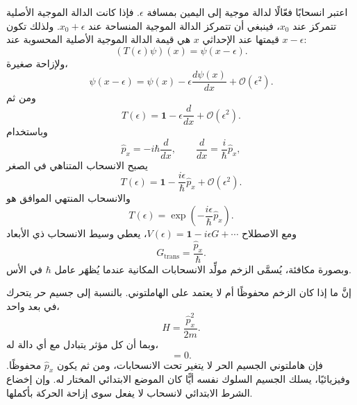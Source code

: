 اعتبر انسحابًا فعّالًا لدالة موجية إلى اليمين بمسافة \(\epsilon\). فإذا كانت الدالة الموجية الأصلية تتمركز عند \(x_0\)، فينبغي أن تتمركز الدالة الموجية المنساحة عند \(x_0+\epsilon\). ولذلك تكون قيمتها عند الإحداثي \(x\) هي قيمة الدالة الموجية الأصلية المحسوبة عند \(x-\epsilon\):
\begin{equation}
(T(\epsilon)\psi)(x)=\psi(x-\epsilon).
\end{equation}
ولإزاحة صغيرة،
\begin{equation}
\psi(x-\epsilon)
=
\psi(x)-\epsilon\frac{d\psi(x)}{dx}
+\mathcal O(\epsilon^2).
\end{equation}
ومن ثم
\begin{equation}
T(\epsilon)
=
\mathbf 1-\epsilon\frac{d}{dx}
+\mathcal O(\epsilon^2).
\end{equation}
وباستخدام
\begin{equation}
\hat p_x=-i\hbar\frac{d}{dx},
\qquad
\frac{d}{dx}=\frac{i}{\hbar}\hat p_x,
\end{equation}
يصبح الانسحاب المتناهي في الصغر
\begin{equation}
T(\epsilon)
=
\mathbf 1-\frac{i\epsilon}{\hbar}\hat p_x
+\mathcal O(\epsilon^2).
\end{equation}
والانسحاب المنتهي الموافق هو
\begin{equation}
T(\epsilon)
=
\exp\left(-\frac{i\epsilon}{\hbar}\hat p_x\right).
\end{equation}
ومع الاصطلاح \(V(\epsilon)=\mathbf 1-i\epsilon G+\cdots\)، يعطي وسيط الانسحاب ذي الأبعاد
\begin{equation}
G_{\mathrm{trans}}=\frac{\hat p_x}{\hbar}.
\end{equation}
وبصورة مكافئة، يُسمَّى الزخم مولِّد الانسحابات المكانية عندما يُظهَر عامل \(\hbar\) في الأس.

\begin{classroomqa}
\end{classroomqa}

إنَّ ما إذا كان الزخم محفوظًا أم لا يعتمد على الهاملتوني. بالنسبة إلى جسيم حر يتحرك في بعد واحد،
\begin{equation}
H=\frac{\hat p_x^2}{2m}.
\end{equation}
وبما أن كل مؤثر يتبادل مع أي دالة له،
\begin{equation}
[H,\hat p_x]=0.
\end{equation}
فإن هاملتوني الجسيم الحر لا يتغير تحت الانسحابات، ومن ثم يكون \(\hat p_x\) محفوظًا. وفيزيائيًا، يسلك الجسيم السلوك نفسه أيًّا كان الموضع الابتدائي المختار له. وإن إخضاع الشرط الابتدائي لانسحاب لا يفعل سوى إزاحة الحركة بأكملها.

